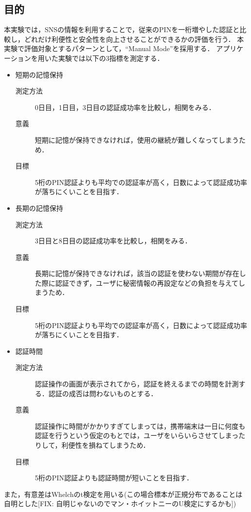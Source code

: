 \subsection{目的}
本実験では，SNSの情報を利用することで，従来のPINを一桁増やした認証と比較し，どれだけ利便性と安全性を向上させることができるかの評価を行う．
本実験で評価対象とするパターンとして，``Manual Mode''を採用する．
アプリケーションを用いた実験では以下の3指標を測定する．

\begin{itemize}
  \item 短期の記憶保持
    \begin{description}
      \item[測定方法] 0日目，1日目，3日目の認証成功率を比較し，相関をみる．
      \item[意義] 短期に記憶が保持できなければ，使用の継続が難しくなってしまうため．
      \item[目標] 5桁のPIN認証よりも平均での認証率が高く，日数によって認証成功率が落ちにくいことを目指す．
    \end{description}
  \item 長期の記憶保持
    \begin{description}
      \item[測定方法] 3日目と8日目の認証成功率を比較し，相関をみる．
      \item[意義] 長期に記憶が保持できなければ，該当の認証を使わない期間が存在した際に認証できず，ユーザに秘密情報の再設定などの負担を与えてしまうため．
      \item[目標] 5桁のPIN認証よりも平均での認証率が高く，日数によって認証成功率が落ちにくいことを目指す．
    \end{description}
  \item 認証時間
    \begin{description}
      \item[測定方法] 認証操作の画面が表示されてから，認証を終えるまでの時間を計測する．認証の成否は問わないものとする．
      \item[意義] 認証操作に時間がかかりすぎてしまっては，携帯端末は一日に何度も認証を行うという仮定のもとでは，ユーザをいらいらさせてしまったりして，利便性を損ねてしまうため．
      \item[目標] 5桁のPIN認証よりも認証時間が短いことを目指す．
    \end{description}
\end{itemize}

また，有意差はWhelchのt検定を用いる(この場合標本が正規分布であることは自明とした[FIX: 自明じゃないのでマン・ホイットニーのU検定にするかも])

